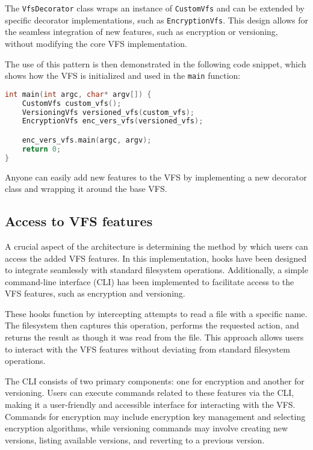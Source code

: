 The \texttt{VfsDecorator} class wraps an instance of \texttt{CustomVfs} and can be extended by specific decorator implementations, such as \texttt{EncryptionVfs}.
This design allows for the seamless integration of new features, such as encryption or versioning, without modifying the core VFS implementation.

The use of this pattern is then demonstrated in the following code snippet, which shows how the VFS is initialized and used in the \texttt{main} function:

\begin{lstlisting}[language=c++, basicstyle=\ttfamily\small]
int main(int argc, char* argv[]) {
    CustomVfs custom_vfs();
    VersioningVfs versioned_vfs(custom_vfs);
    EncryptionVfs enc_vers_vfs(versioned_vfs);

    enc_vers_vfs.main(argc, argv);
    return 0;
}
\end{lstlisting}

Anyone can easily add new features to the VFS by implementing a new decorator class and wrapping it around the base VFS\@.

\subsection{Access to VFS features}\label{subsec:access-to-vfs-features}

A crucial aspect of the architecture is determining the method by which users can access the added VFS features.
In this implementation, hooks have been designed to integrate seamlessly with standard filesystem operations.
Additionally, a simple command-line interface (CLI) has been implemented to facilitate access to the VFS features, such as encryption and versioning.

These hooks function by intercepting attempts to read a file with a specific name.
The filesystem then captures this operation, performs the requested action, and returns the result as though it was read from the file.
This approach allows users to interact with the VFS features without deviating from standard filesystem operations.

The CLI consists of two primary components: one for encryption and another for versioning.
Users can execute commands related to these features via the CLI, making it a user-friendly and accessible interface for interacting with the VFS\@.
Commands for encryption may include encryption key management and selecting encryption algorithms, while versioning commands may involve creating new versions, listing available versions, and reverting to a previous version.

